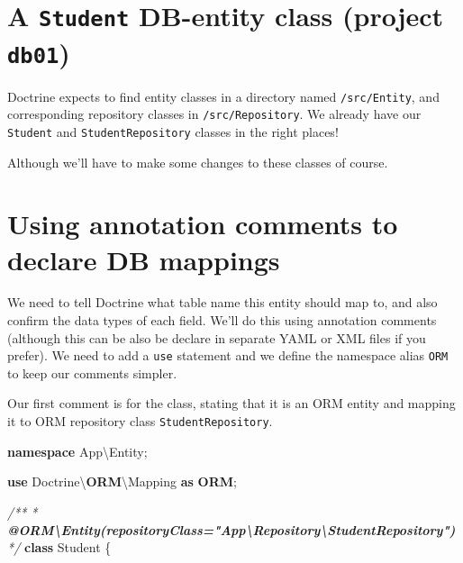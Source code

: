 \documentclass[a4paperpaper,openright]{book}
\newenvironment{Shaded}{}{}
\newcommand{\AnnotationTok}[1]{\textcolor[rgb]{0.38,0.63,0.69}{\textbf{\textit{#1}}}}
\newcommand{\CommentTok}[1]{\textcolor[rgb]{0.38,0.63,0.69}{\textit{#1}}}
\newcommand{\KeywordTok}[1]{\textcolor[rgb]{0.00,0.44,0.13}{\textbf{#1}}}
\newcommand{\NormalTok}[1]{#1}
\newcommand{\OtherTok}[1]{\textcolor[rgb]{0.00,0.44,0.13}{#1}}
\begin{document}
\hypertarget{a-student-db-entity-class-project-db01}{%
\section{\texorpdfstring{A \texttt{Student} DB-entity class (project
\texttt{db01})}{A Student DB-entity class (project db01)}}\label{a-student-db-entity-class-project-db01}}

Doctrine expects to find entity classes in a directory named
\texttt{/src/Entity}, and corresponding repository classes in
\texttt{/src/Repository}. We already have our \texttt{Student} and
\texttt{StudentRepository} classes in the right places!

Although we'll have to make some changes to these classes of course.

\hypertarget{using-annotation-comments-to-declare-db-mappings}{%
\section{Using annotation comments to declare DB
mappings}\label{using-annotation-comments-to-declare-db-mappings}}

We need to tell Doctrine what table name this entity should map to, and
also confirm the data types of each field. We'll do this using
annotation comments (although this can be also be declare in separate
YAML or XML files if you prefer). We need to add a \texttt{use}
statement and we define the namespace alias \texttt{ORM} to keep our
comments simpler.

Our first comment is for the class, stating that it is an ORM entity and
mapping it to ORM repository class \texttt{StudentRepository}.

\begin{Shaded}
\begin{Highlighting}[]
    \KeywordTok{namespace}\NormalTok{ App\textbackslash{}Entity}\OtherTok{;}

    \KeywordTok{use}\NormalTok{ Doctrine\textbackslash{}}\KeywordTok{ORM}\NormalTok{\textbackslash{}Mapping }\KeywordTok{as} \KeywordTok{ORM}\OtherTok{;}

    \CommentTok{/**}
\CommentTok{     * }\AnnotationTok{@ORM\textbackslash{}Entity(repositoryClass="App\textbackslash{}Repository\textbackslash{}StudentRepository")}
\CommentTok{     */}
    \KeywordTok{class}\NormalTok{ Student}
\NormalTok{    \{}
\end{Highlighting}
\end{Shaded}
\end{document}
